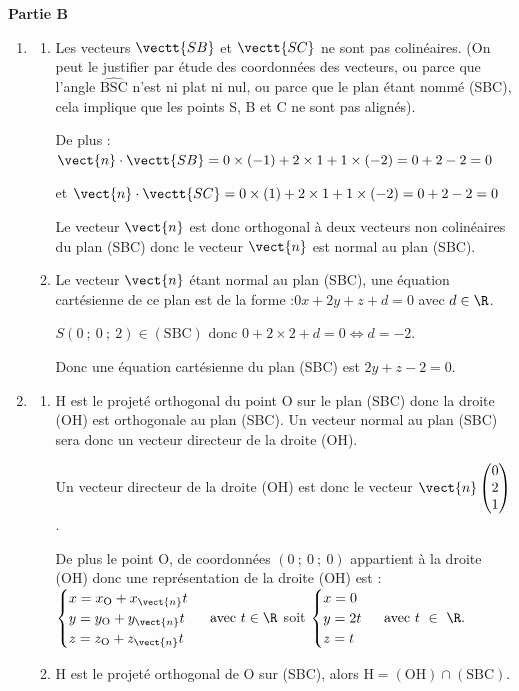 	\textbf{Partie B}
	
	\begin{enumerate}
	\item \begin{enumerate}
		\item Les vecteurs $\vectt{SB}$ et $\vectt{SC}$ ne sont pas colinéaires.
		(On peut le justifier par étude des coordonnées des vecteurs, ou parce que l'angle $\widehat{\mathrm{BSC}}$ n'est ni plat ni nul, ou parce que le plan étant nommé (SBC), cela implique que les points S, B et C ne sont pas alignés).

		De plus : \quad $\vect{n} \cdot \vectt{SB} = 0 \times (-1) + 2 \times 1 +1 \times (-2) = 0 +2-2=0$

		et \quad $\vect{n} \cdot \vectt{SC} = 0 \times (1) + 2 \times 1 +1 \times (-2) = 0 +2-2=0$

		Le vecteur $\vect{n}$ est donc orthogonal à deux vecteurs non colinéaires du plan (SBC) donc le vecteur $\vect{n}$ est normal au plan (SBC).

		\item Le vecteur $\vect{n}$ étant normal au plan (SBC), une équation cartésienne de ce plan est de la forme :\quad $0x+2y+z+d=0$ \quad avec $d \in \R$.

		$S(0~;~0~;~2) \in (\mathrm{SBC})$ \quad donc \quad $0+2\times 2+d=0 \iff d=-2$.

		Donc une équation cartésienne du plan (SBC) est \quad $2 y+z-2=0$.

\end{enumerate}
\item
	\begin{enumerate}
			\item H est le projeté orthogonal du point O sur le plan (SBC) donc la droite (OH) est orthogonale au plan (SBC). Un vecteur normal au plan (SBC) sera donc un vecteur directeur de la droite (OH).

Un vecteur directeur de la droite (OH) est donc le vecteur $\vect{n}\begin{pmatrix} 0\\ 2\\ 1\\ \end{pmatrix}$.

De plus le point O, de coordonnées $(0~;~0~;~0)$ appartient à la droite (OH) donc une représentation de la droite (OH) est :\quad
$\begin{cases}
x =x_{\text{O}} + x_{\vect{n}}t\\
y =y_{\text{O}} + y_{\vect{n}}t\\
z =z_{\text{O}} + z_{\vect{n}}t\\
	\end{cases}\text{ avec } t \in \R$ \quad soit \quad
	$\begin{cases}
x =0\\
y =2 t\\
z =t\\
\end{cases}\text{ avec } t~\in~\R.$
		\item H est le projeté orthogonal de O sur (SBC), alors $\mathrm{H} = (\mathrm{OH}) \cap \mathrm{(SBC)}$.


\end{enumerate}
\end{enumerate}
